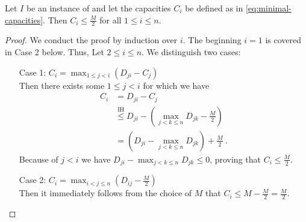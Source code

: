 \begin{lemma}
	\label{lemma:capacities-bounded}
	Let $I$ be an instance of \RRL and let the capacities $C_i$ be defined as in \cref{eq:minimal-capacities}.
	Then $C_i \leq \frac{M}{2}$ for all $1 \leq i \leq n$.
\end{lemma}
\begin{proof}
	We conduct the proof by induction over $i$. 
	The beginning $i=1$ is covered in Case 2 below. 
	Thus, Let $2 \leq i \leq n$.
	We distinguish two cases:
	\begin{enumerate}[align=left]
		\item[Case 1: $C_i = \max_{1 \leq j < i}(D_{ji} - C_j)$]{\mbox{}\\
			Then there exists some $1 \leq j < i$ for which we have
			\begin{align}
				C_i &= D_{ji} - C_j \\
				&\stackrel{\mathrm{IH}}{\leq} D_{ji} - \left(\max_{j < k \leq n} D_{jk} - \frac{M}{2}\right)\\
				&= (D_{ji} - \max_{j < k \leq n} D_{jk}) + \frac{M}{2} \ .
			\end{align}
			Because of $j < i$ we have $D_{ji} - \max_{j < k \leq n} D_{jk} \leq 0$, proving that $C_i \leq \frac{M}{2}$.
		}
		\item[Case 2: $C_i = \max_{i < j \leq n}(D_{ij} - \frac{M}{2})$]{\mbox{}\\
			Then it immediately follows from the choice of $M$ that $C_i \leq M - \frac{M}{2} = \frac{M}{2}$.
		}
	\end{enumerate}
\end{proof}

